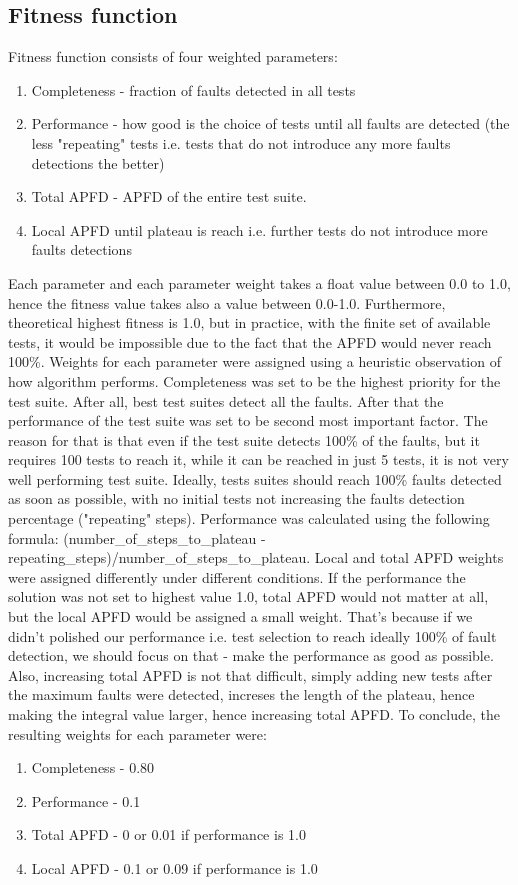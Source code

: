 \documentclass[12pt]{article}
\begin{document}
\subsection{Fitness function}
Fitness function consists of four weighted parameters:
\begin{enumerate}
  \item Completeness - fraction of faults detected in all tests
  \item Performance - how good is the choice of tests until all faults are detected (the less "repeating" tests i.e. tests that do not introduce any more faults detections the better)
  \item Total APFD - APFD of the entire test suite.
  \item Local APFD until plateau is reach i.e. further tests do not introduce more faults detections
\end{enumerate}
Each parameter and each parameter weight takes a float value between 0.0 to 1.0, hence the fitness value takes also a value between 0.0-1.0. Furthermore, theoretical highest fitness is 1.0, but in practice, with the finite set of available tests, it would be impossible due to the fact that the APFD would never reach 100\%.
Weights for each parameter were assigned using a heuristic observation of how algorithm performs. Completeness was set to be the highest priority for the test suite. After all, best test suites detect all the faults. After that the performance of the test suite was set to be second most important factor. The reason for that is that even if the test suite detects 100\% of the faults, but it requires 100 tests to reach it, while it can be reached in just 5 tests, it is not very well performing test suite. Ideally, tests suites should reach 100\% faults detected as soon as possible, with no initial tests not increasing the faults detection percentage ("repeating" steps). Performance was calculated using the following formula: (number\_of\_steps\_to\_plateau - repeating\_steps)/number\_of\_steps\_to\_plateau. Local and total APFD weights were assigned differently under different conditions. If the performance the solution was not set to highest value 1.0, total APFD would not matter at all, but the local APFD would be assigned a small weight. That's because if we didn't polished our performance i.e. test selection to reach ideally 100\% of fault detection, we should focus on that - make the performance as good as possible. Also, increasing total APFD is not that difficult, simply adding new tests after the maximum faults were detected, increses the length of the plateau, hence making the integral value larger, hence increasing total APFD. To conclude, the resulting weights for each parameter were:
\begin{enumerate}
  \item Completeness - 0.80
  \item Performance - 0.1
  \item Total APFD - 0 or 0.01 if performance is 1.0
  \item Local APFD - 0.1 or 0.09 if performance is 1.0
\end{enumerate}
\end{document}
